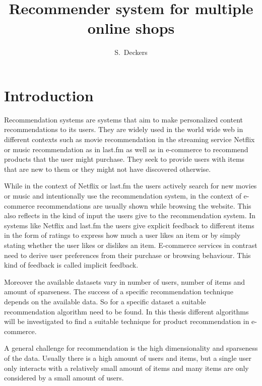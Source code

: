 \documentclass[10pt]{reportMaster}
\title{Recommender system for multiple online shops}
\author{S.\ Deckers}
\date{} %
\begin{document}
\maketitle

\chapter{Introduction}
Recommendation systems are systems that aim to make personalized content recommendations to its users.
They are widely used in the world wide web in different contexts such as movie recommendation in the streaming service Netflix or music recommendation as in last.fm as well as in e-commerce to recommend products that the user might purchase.
They seek to provide users with items that are new to them or they might not have discovered otherwise.

While in the context of Netflix or last.fm the users actively search for new movies or music and intentionally use the recommendation system, in the context of e-commerce recommendations are usually shown while browsing the website.
This also reflects in the kind of input the users give to the recommendation system.
In systems like Netflix and last.fm the users give explicit feedback to different items in the form of ratings to express how much a user likes an item or by simply stating whether the user likes or dislikes an item.
E-commerce services in contrast need to derive user preferences from their purchase or browsing behaviour.
This kind of feedback is called implicit feedback.

Moreover the available datasets vary in number of users, number of items and amount of sparseness.
The success of a specific recommendation technique depends on the available data.
So for a specific dataset a suitable recommendation algorithm need to be found. %
In this thesis different algorithms will be investigated to find a suitable technique for product recommendation in e-commerce.

A general challenge for recommendation is the high dimensionality and sparseness of the data.
Usually there is a high amount of users and items, but a single user only interacts with a relatively small amount of items and many items are only considered by a small amount of users.
\end{document}
